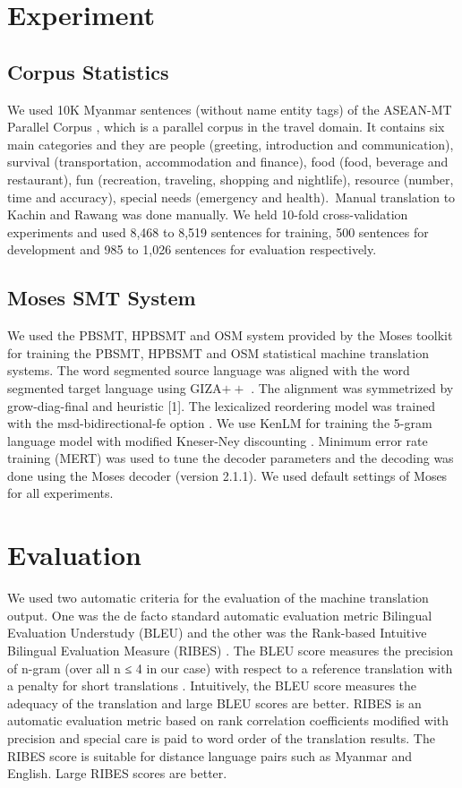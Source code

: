\documentclass[conference]{IEEEtran}
\begin{document}
\section{Experiment}
\label{sec:Exp}

\subsection {Corpus Statistics}
\label{subsec:Corpus}

We used 10K Myanmar sentences (without name entity tags) of the ASEAN-MT Parallel Corpus \cite{b18}, which is a parallel corpus in the travel domain. It contains six main categories and they are people (greeting, introduction and communication), survival (transportation, accommodation and finance), food (food, beverage and restaurant), fun (recreation, traveling, shopping and nightlife), resource (number, time and accuracy), special needs (emergency and health). Manual translation to Kachin and Rawang was done manually. We held 10-fold cross-validation experiments and used 8,468 to 8,519 sentences for training, 500 sentences for development and 985 to 1,026 sentences for evaluation respectively.

\subsection {Moses SMT System}
\label{subsec:Moses}
We used the PBSMT, HPBSMT and OSM system provided by the Moses toolkit \cite{b19} for training the PBSMT, HPBSMT and OSM statistical machine translation systems. The word segmented source language was aligned with the word segmented target language using GIZA\ensuremath{++} \cite{b20}. The alignment was symmetrized by grow-diag-final and heuristic [1]. The lexicalized reordering model was trained with the msd-bidirectional-fe option \cite{b21}. We use KenLM \cite{b22} for training the 5-gram language model with modified Kneser-Ney discounting \cite{b23}. Minimum error rate training (MERT) \cite{b24} was used to tune the decoder parameters and the decoding was done using the Moses decoder (version 2.1.1). We used default settings of Moses for all experiments.

\section{Evaluation}
\label{sec:Evaluation}
We used two automatic criteria for the evaluation of the machine translation output. One was the de facto standard automatic evaluation metric Bilingual Evaluation Understudy (BLEU) \cite{b6} and the other was the Rank-based Intuitive Bilingual Evaluation Measure (RIBES) \cite{b7}.  The BLEU score measures the precision of n-gram (over all n ≤ 4 in our case) with respect to a reference translation with a penalty for short translations \cite{b6}. Intuitively, the BLEU score measures the adequacy of the translation and large BLEU scores are better. RIBES is an automatic evaluation metric based on rank correlation coefficients modified with precision and special care is paid to word order of the translation results. The RIBES score is suitable for distance language pairs such as Myanmar and English. Large RIBES scores are better.
\end{document}
